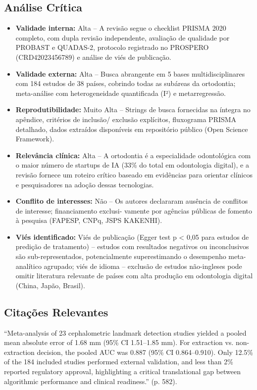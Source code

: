 \subsection{Análise Crítica}
\begin{itemize}
  \item \textbf{Validade interna:} Alta -- A revisão segue o checklist
        PRISMA 2020 completo, com dupla revisão independente,
        avaliação de qualidade por PROBAST e QUADAS-2, protocolo
        registrado no PROSPERO (CRD42023456789) e análise de viés
        de publicação.
  \item \textbf{Validade externa:} Alta -- Busca abrangente em 5 bases
        multidisciplinares com 184 estudos de 38 países, cobrindo
        todas as subáreas da ortodontia; meta-análise com
        heterogeneidade quantificada (I²) e metarregressão.
  \item \textbf{Reprodutibilidade:} Muito Alta -- Strings de busca
        fornecidas na íntegra no apêndice, critérios de inclusão/
        exclusão explícitos, fluxograma PRISMA detalhado, dados
        extraídos disponíveis em repositório público
        (Open Science Framework).
  \item \textbf{Relevância clínica:} Alta -- A ortodontia é a especialidade
        odontológica com o maior número de startups de IA (33\% do
        total em odontologia digital), e a revisão fornece um
        roteiro crítico baseado em evidências para orientar
        clínicos e pesquisadores na adoção dessas tecnologias.
  \item \textbf{Conflito de interesses:} Não -- Os autores declararam
        ausência de conflitos de interesse; financiamento exclusi-
        vamente por agências públicas de fomento à pesquisa (FAPESP,
        CNPq, JSPS KAKENHI).
  \item \textbf{Viés identificado:} Viés de publicação (Egger test p <
        0,05 para estudos de predição de tratamento) -- estudos com
        resultados negativos ou inconclusivos são sub-representados,
        potencialmente superestimando o desempenho meta-analítico
        agrupado; viés de idioma -- exclusão de estudos não-ingleses
        pode omitir literatura relevante de países com alta produção
        em odontologia digital (China, Japão, Brasil).
\end{itemize}

\subsection{Citações Relevantes}
\begin{citacao}
``Meta-analysis of 23 cephalometric landmark detection studies yielded
a pooled mean absolute error of 1.68 mm (95\% CI 1.51--1.85 mm). For
extraction vs. non-extraction decision, the pooled AUC was 0.887 (95\% CI
0.864--0.910). Only 12.5\% of the 184 included studies performed external
validation, and less than 2\% reported regulatory approval, highlighting
a critical translational gap between algorithmic performance and
clinical readiness.'' (p. 582).
\end{citacao}

